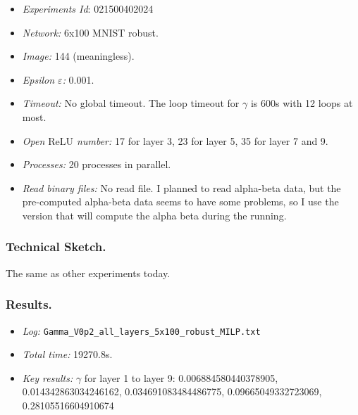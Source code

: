 \documentclass{llncs}
\newcommand{\ReLU}{\mathrm{ReLU}}
\begin{document}
\begin{itemize}
	\item \emph{Experiments Id}: 021500402024
	
	\item\emph{Network:} 6x100 MNIST robust. 
	
	\item\emph{Image:} 144 (meaningless).
	
	\item\emph{Epsilon $\varepsilon$:} 0.001.
	
	\item\emph{Timeout:} No global timeout. The loop timeout for $\gamma$ is 600s with 12 loops at most.
	
	\item\emph{Open $\ReLU$ number:} 17 for layer 3, 23 for layer 5, 35 for layer 7 and 9. 
	
	\item\emph{Processes:} 20 processes in parallel.
	
	\item\emph{Read binary files:} No read file. I planned to read alpha-beta data, but the pre-computed alpha-beta data seems to have some problems, so I use the version that will compute the alpha beta during the running.
\end{itemize}







\subsubsection*{Technical Sketch.}


The same as other experiments today.

\subsubsection*{Results.}


\begin{itemize}
	\item \emph{Log:} \verb*|Gamma_V0p2_all_layers_5x100_robust_MILP.txt|
	
	\item \emph{Total time:} 19270.8s.
	
	\item \emph{Key results:} $\gamma$ for layer 1 to layer 9: 0.006884580440378905, 0.014342863034246162,
	0.034691083484486775, 0.09665049332723069,
	0.28105516604910674
\end{itemize}
\end{document}
